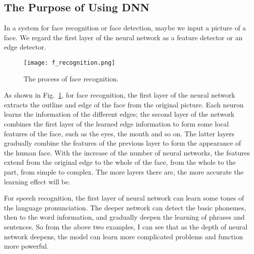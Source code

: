 \documentclass[a4paper]{article}
\begin{document}
\subsection{The Purpose of Using DNN}
In a system for face recognition or face detection, maybe we input a picture of a face. We regard the first layer of the neural network as a feature detector or an edge detector. 
%
\begin{figure}[ht]
	\centering
	\texttt{[image: f\_recognition.png]}
	\caption{The process of face recognition.}
	\label{f_recognition}
\end{figure}
%
\par
As shown in Fig.~\ref{f_recognition}, for face recognition, the first layer of the neural network extracts the outline and edge of the face from the original picture. Each neuron learns the information of the different edges; the second layer of the network combines the first layer of the learned edge information to form some local features of the face, such as the eyes, the mouth and so on. The latter layers gradually combine the features of the previous layer to form the appearance of the human face. With the increase of the number of neural networks, the features extend from the original edge to the whole of the face, from the whole to the part, from simple to complex. The more layers there are, the more accurate the learning effect will be.
\par
For speech recognition, the first layer of neural network can learn some tones of the language pronunciation. The deeper network can detect the basic phonemes, then to the word information, and gradually deepen the learning of phrases and sentences. So from the above two examples, I can see that as the depth of neural network deepens, the model can learn more complicated problems and function more powerful.
\end{document}
